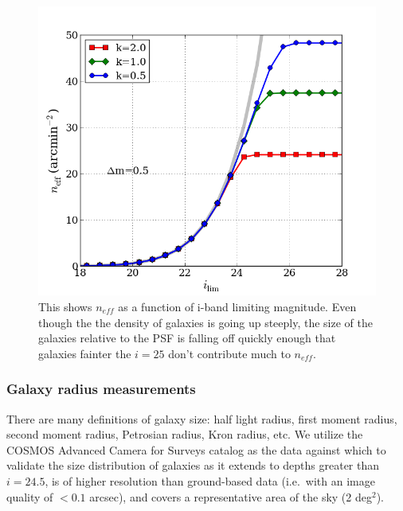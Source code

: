 \documentclass[]{article}
\begin{document}
{%
\begin{figure}[H]
\centering
\includegraphics[width=5in]{validation_figures/neff_m_ir.png}
\caption{This shows $n_{eff}$ as a function of i-band limiting magnitude.  Even though the the density of galaxies is going up steeply, the 
size of the galaxies relative to the PSF is falling off quickly enough that galaxies fainter the $i=25$ don't contribute much to $n_{eff}$.\label{fig:neffvm}}
\end{figure}


\subsubsection{Galaxy radius measurements}
There are many definitions of galaxy size: half light radius, first
moment radius, second moment radius, Petrosian radius, Kron radius,
etc.  We utilize the COSMOS Advanced Camera for Surveys catalog
\citep{cosmos} as the data against which to validate the size
distribution of galaxies as it extends to depths greater than
$i=24.5$, is of higher resolution than ground-based data (i.e.\ with
an image quality of $<0.1$ arcsec), and covers a representative area
of the sky (2 deg$^2$).

}
\end{document}
